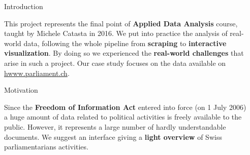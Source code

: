 \documentclass[final]{beamer}
\newlength{\sepwid}
\newlength{\onecolwid}
\begin{document}

\setlength{\belowcaptionskip}{2ex} %
\setlength\belowdisplayshortskip{2ex} %


\begin{frame}[t] %

\begin{columns}[t] %

\begin{column}{\sepwid}\end{column} %

\begin{column}{\onecolwid} %


\begin{block}{Introduction}

This project represents the final point of {\bf Applied Data Analysis} course, taught by Michele Catasta in 2016. We put into practice the analysis of real-world data, following the whole pipeline from {\bf scraping} to {\bf interactive visualization}. By doing so we experienced the \textbf{real-world challenges} that arise in such a project. Our case study focuses on the data available on \url{hwww.parliament.ch}.

\end{block}


\begin{block}{Motivation}

Since the \textbf{Freedom of Information Act} entered into force (on 1 July 2006) a huge amount of data related to political activities is freely available to the public. However, it represents a large number of hardly understandable documents. We suggest an interface giving a \textbf{light overview} of Swiss parliamentarians activities.


\end{block}
\end{column}
\end{columns}
\end{frame}
\end{document}
